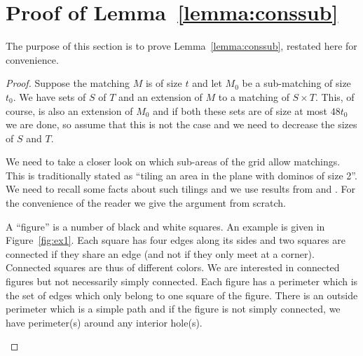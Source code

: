 \documentclass{article}\usepackage[a4paper,margin=20mm]{geometry}
\begin{document}


\newpage
\appendix

\section{Proof of Lemma~\ref{lemma:conssub}} \label{sec:proof}

The purpose of this section is to prove Lemma~\ref{lemma:conssub}, restated
here for convenience.

\Conslemma*

\begin{proof}
Suppose the matching $M$ is of size $t$ and
let $M_0$ be a sub-matching of size $t_0$.  We have
sets of $S$ of $T$ and an extension
of $M$ to a matching of $S \times T$.  This,
of course, is also an extension of $M_0$ and if both these
sets are of size at most $48t_0$ we are done,
so assume that this is not the case and we need
to decrease the sizes of $S$ and $T$.

We need to take a
closer look on which sub-areas of the grid allow
matchings.  This is traditionally stated
as ``tiling an area in the plane with dominos of size 2''.
We need to recall some facts about such tilings
and we use results from \cite{thiant} and \cite{fournier}.
For the convenience of the reader we give the argument
from scratch.   

A ``figure'' is a number of black
and white squares.  An example is given in Figure~\ref{fig:ex1}.
Each square has four edges
along its sides and two squares are connected 
if they share an edge (and not if they only
meet at a corner).  Connected squares are thus of
different colors.  We are interested in connected
figures but not necessarily simply connected.
Each figure has a perimeter which is the set of edges
which only belong to one square of the figure.
There is an outside perimeter which is a simple path and
if the figure is not simply connected, we have
perimeter(s) around any interior hole(s).

\medskip
\begin{figure}[h]
\begin{center}
\end{center}
\end{figure}
\end{proof}
\end{document}
